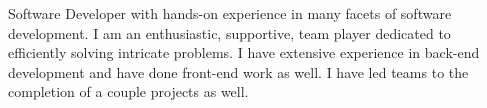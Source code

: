 
\begin{cvparagraph}
Software Developer with hands-on experience in many facets of software development.  I am an enthusiastic, supportive, team player dedicated to efficiently solving intricate problems.  I have extensive experience in back-end development and have done front-end work as well.  I have led teams to the completion of a couple projects as well.
\end{cvparagraph}